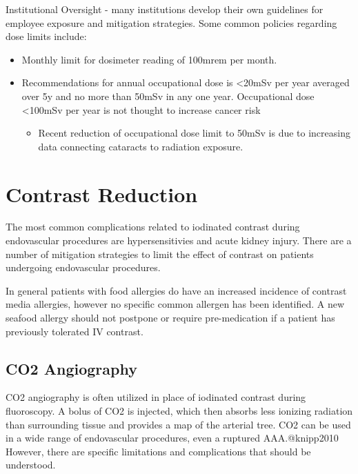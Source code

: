 \documentclass[
]{book}
\providecommand{\tightlist}{%
  \setlength{\itemsep}{0pt}\setlength{\parskip}{0pt}}
\begin{document}
Institutional Oversight - many institutions develop their own guidelines
for employee exposure and mitigation strategies. Some common policies
regarding dose limits include:

\begin{itemize}
\item
  Monthly limit for dosimeter reading of 100mrem per month.
\item
  Recommendations for annual occupational dose is \textless20mSv per year
  averaged over 5y and no more than 50mSv in any one year.
  Occupational dose \textless100mSv per year is not thought to increase
  cancer risk

  \begin{itemize}
  \tightlist
  \item
    Recent reduction of occupational dose limit to 50mSv is due to
    increasing data connecting cataracts to radiation
    exposure.\citep{hamada2017}
  \end{itemize}
\end{itemize}

\hypertarget{contrast-reduction}{%
\section{Contrast Reduction}\label{contrast-reduction}}

The most common complications related to iodinated contrast during
endovascular procedures are hypersensitivies and acute kidney injury.
There are a number of mitigation strategies to limit the effect of
contrast on patients undergoing endovascular procedures.

In general patients with food allergies do have an increased incidence
of contrast media allergies, however no specific common allergen has
been identified. A new seafood allergy should not postpone or require
pre-medication if a patient has previously tolerated IV
contrast.\citep{schabelman2010}

\hypertarget{co2-angiography}{%
\subsection{CO2 Angiography}\label{co2-angiography}}

CO2 angiography is often utilized in place of iodinated contrast during
fluoroscopy. A bolus of CO2 is injected, which then absorbs less
ionizing radiation than surrounding tissue and provides a map of the
arterial tree. CO2 can be used in a wide range of endovascular
procedures, even a ruptured AAA.@knipp2010 However, there are specific
limitations and complications that should be understood.
\end{document}
